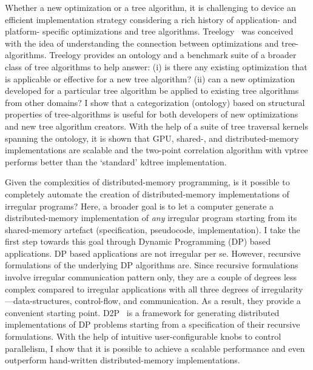 Whether a new optimization or a tree algorithm, it is challenging to device an efficient implementation strategy considering a rich history of application- and platform- specific optimizations and tree algorithms.
Treelogy~\cite{hegde17ispass} was conceived with the idea of understanding the connection between optimizations and tree-algorithms. 
Treelogy provides an ontology and a benchmark suite of a broader class of tree algorithms to help answer: (i) is there any existing optimization that is applicable or effective for a new tree algorithm?
(ii) can a new optimization developed for a particular tree algorithm be applied to existing tree algorithms from other domains?
I show that a categorization (ontology) based on structural properties of tree-algorithms is useful for both developers of new optimizations and new tree algorithm creators.
With the help of a suite of tree traversal kernels spanning the ontology, it is shown that GPU, shared-, and distributed-memory implementations are scalable and the two-point correlation algorithm with vptree performs better than the `standard' kdtree implementation.

Given the complexities of distributed-memory programming, is it possible to completely automate the creation of distributed-memory implementations of irregular programs? 
Here, a broader goal is to let a computer generate a distributed-memory implementation of {\em any} irregular program starting from its shared-memory artefact (specification, pseudocode, implementation). 
I take the first step towards this goal through Dynamic Programming (DP) based applications. 
DP based applications are not irregular per se. 
However, recursive formulations of the underlying DP algorithms are. 
Since recursive formulations involve irregular communication pattern only, they are a couple of degrees less complex compared to irregular applications with all three degrees of irregularity---data-structures, control-flow, and communication. As a result, they provide a convenient starting point. 
D2P~\cite{hegde19d2p} is a framework for generating distributed implementations of DP problems starting from a specification of their recursive formulations.
With the help of intuitive user-configurable knobs to control parallelism, I show that it is possible to achieve a scalable performance and even outperform hand-written distributed-memory implementations.

